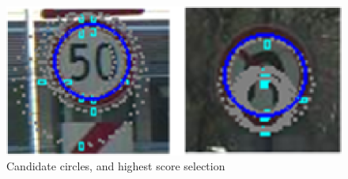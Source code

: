 \documentclass[twocolumn,letterpaper,10pt]{article}
\begin{document}
\begin{figure}[ht]
\begin{center}
\includegraphics[scale=0.5]{img/fig_radial2.eps}
\caption{Candidate circles, and highest score selection}
\label{fig:rad_2}
\end{center}
\end{figure}
\par
\end{document}
